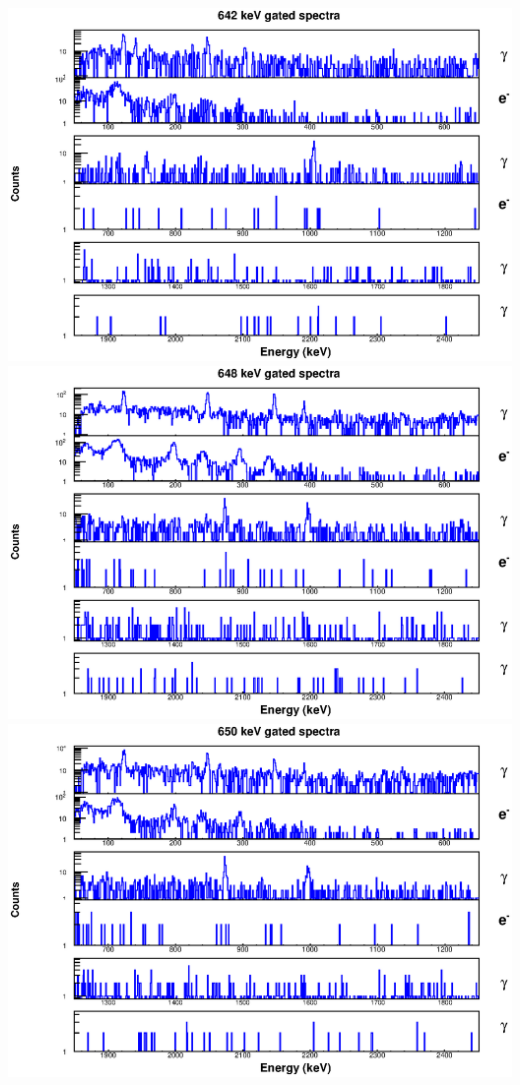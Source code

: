 \begin{landscape}
\includegraphics[scale=1.1]{154Gd_Appendix/642_combined.eps}
\includegraphics[scale=1.1]{154Gd_Appendix/648_combined.eps}
\includegraphics[scale=1.1]{154Gd_Appendix/650_combined.eps}

\end{landscape}

